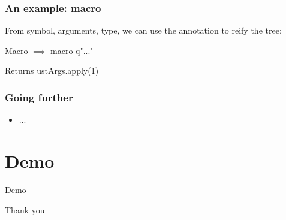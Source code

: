 \documentclass{beamer}
\begin{document}

\begin{frame}
\frametitle{An example: macro}

From symbol, arguments, type, we can use the annotation to reify the tree:
\begin{block}{Macro}
 $\implies$ macro q"..."
\end{block}

\begin{block}{Returns}
ustArgs.apply(1)
\end{block}

\end{frame}


\begin{frame}
\frametitle{Going further}

\begin{itemize}
\item ...
\end{itemize}

\end{frame}

\section{Demo}
\begin{frame}
\Huge{\centerline{Demo}}
\end{frame}


\begin{frame}
\Huge{\centerline{Thank you}}
\end{frame}


%


\end{document}
